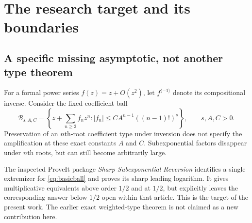 \documentclass[11pt,a4paper]{article}
\theoremstyle{definition}
\theoremstyle{remark}
\newcommand{\inv}{^{\langle-1\rangle}}
\numberwithin{equation}{section}
\begin{document}
\section{The research target and its boundaries}\label{sec:target}

\subsection{A specific missing asymptotic, not another type theorem}
For a formal power series $f(z)=z+O(z^2)$, let $f\inv$ denote its
compositional inverse. Consider the fixed coefficient ball
\begin{equation}
 \mathcal B_{s,A,C}
 =\left\{z+\sum_{n\ge2}f_nz^n:
       |f_n|\le C A^{n-1}((n-1)!)^s\right\},
 \qquad s,A,C>0.
 \label{eq:basicball}
\end{equation}
Preservation of an $n$th-root coefficient type under inversion does not
specify the amplification at these exact constants $A$ and $C$.
Subexponential factors disappear under $n$th roots, but can still
become arbitrarily large.

The inspected ProveIt package \emph{Sharp Subexponential Reversion}
\cite{subexp} identifies a single extremizer for \eqref{eq:basicball} and
proves its sharp leading logarithm. It gives multiplicative equivalents
above order $1/2$ and at $1/2$, but explicitly leaves the corresponding
answer below $1/2$ open within that article. This is the target of the
present work. The earlier exact weighted-type theorem \cite{weighted}
is not claimed as a new contribution here.
\end{document}

